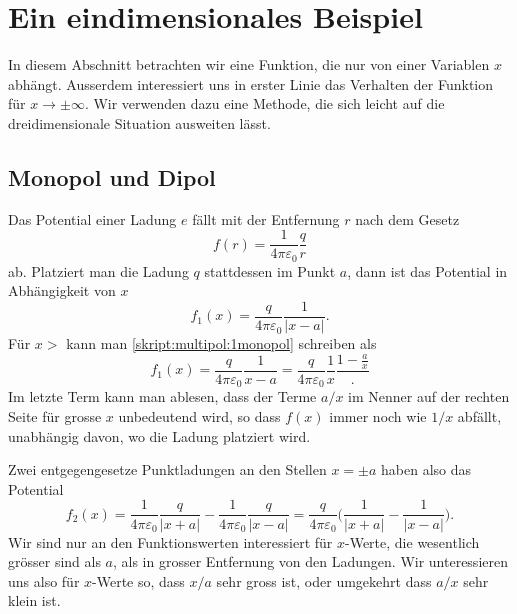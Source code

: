 %
%
%
\section{Ein eindimensionales Beispiel%
\label{skript:multipol:1dimbeispiel}}
In diesem Abschnitt betrachten wir eine Funktion, die nur von einer
Variablen $x$ abhängt.
Ausserdem interessiert uns in erster Linie das Verhalten der Funktion
für $x\to\pm\infty$.
Wir verwenden dazu eine Methode, die sich leicht auf die dreidimensionale
Situation ausweiten lässt.

\subsection{Monopol und Dipol}
Das Potential einer Ladung $e$ fällt mit der Entfernung $r$ nach dem
Gesetz
\[
f(r)=\frac1{4\pi\varepsilon_0}\frac{q}r
\]
ab.
Platziert man die Ladung $q$ stattdessen im Punkt $a$, dann ist das
Potential in Abhängigkeit von $x$
\begin{equation}
f_1(x) = \frac{q}{4\pi\varepsilon_0} \frac1{|x-a|}.
\label{skript:multipol:1monopol}
\end{equation}
Für $x>$ kann man \eqref{skript:multipol:1monopol} schreiben als
\begin{equation}
f_1(x)
=
\frac{q}{4\pi\varepsilon_0} \frac1{x-a}
=
\frac{q}{4\pi\varepsilon_0} \frac1x\frac{1-\displaystyle\frac{a}{x}}.
\label{skript:multipol:1abfall}
\end{equation}
Im letzte Term kann man ablesen, dass der Terme $a/x$ im Nenner
auf der rechten Seite für grosse $x$ unbedeutend wird, so dass $f(x)$
immer noch wie $1/x$ abfällt, unabhängig davon, wo die Ladung platziert
wird.

Zwei entgegengesetze Punktladungen an den Stellen $x=\pm a$ haben also
das Potential
\begin{equation}
f_2(x)
=
\frac1{4\pi\varepsilon_0}\frac{q}{|x+a|}
-
\frac1{4\pi\varepsilon_0}\frac{q}{|x-a|}
=
\frac{q}{4\pi\varepsilon_0}\biggl( \frac1{|x+a|} - \frac1{|x-a|} \biggr).
\label{skript:multipol:1dipol}
\end{equation}
Wir sind nur an den Funktionswerten interessiert für $x$-Werte, die
wesentlich grösser sind als $a$, als in grosser Entfernung von
den Ladungen.
Wir unteressieren uns also für $x$-Werte so, dass $x/a$ sehr gross ist,
oder umgekehrt dass $a/x$ sehr klein ist.

